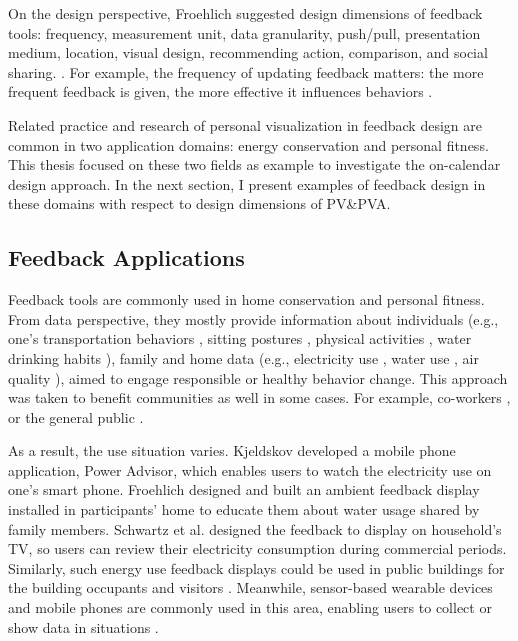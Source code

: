 \documentclass[12pt,oneside]{book}
\begin{document}
On the design perspective, Froehlich suggested design dimensions of feedback tools: frequency, measurement unit, data granularity, push/pull, presentation medium, location, visual design, recommending action, comparison, and social sharing. \cite{froehlich_promoting_2009}. For example, the frequency of updating feedback matters: the more frequent feedback is given, the more effective it influences behaviors \cite{abrahamse_review_2005}.

Related practice and research of personal visualization in feedback design are common in two application domains: energy conservation and personal fitness. This thesis focused on these two fields as example to investigate the on-calendar design approach.  In the next section, I present examples of feedback design in these domains with respect to design dimensions of PV\&PVA.




\subsection{Feedback Applications}
\label{section:feedback examples}
Feedback tools are commonly used in home conservation and personal fitness.  From data perspective, they mostly provide information about individuals (e.g., one's transportation behaviors \cite{consolvo_flowers_2008}, sitting postures \cite{haller_finding_2011}, physical activities \cite{li_using_2012,ahtinen_user_2009}, water drinking habits \cite{chiu_playful_2009}), family and home data (e.g., electricity use \cite{rogers_ambient_2010,schwartz_cultivating_2013}, water use \cite{erickson_dubuque_2013,froehlich_design_2012}, air quality \cite{kim_inair:_2010}), aimed to engage responsible or healthy behavior change.  This approach was taken to benefit communities as well in some cases.  For example, co-workers \cite{lin_fishnsteps:_2006}, or the general public \cite{arroyo_embedded_2012,hazlewood_issues_2011}.

As a result, the use situation varies.  Kjeldskov \cite{kjeldskov_using_2012} developed a mobile phone application, Power Advisor, which enables users to watch the electricity use on one's smart phone.  Froehlich  designed and built an ambient feedback display \cite{froehlich_design_2012} installed in participants' home to educate them about water usage shared by family members.  Schwartz et al.\cite{schwartz_what_2015} designed the feedback to display on household's TV, so users can review their electricity consumption during commercial periods.  Similarly, such energy use feedback displays could be used in public buildings for the building occupants and visitors \cite{arroyo_embedded_2012,hazlewood_issues_2011}.  Meanwhile, sensor-based wearable devices and mobile phones are commonly used in this area, enabling users to collect or show data in situations \cite{consolvo_flowers_2008, froehlich_ubigreen:_2009,bauer_shuteye:_2012}.
\end{document}
